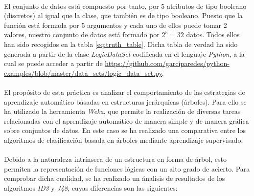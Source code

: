 \documentclass[10pt, a4paper,spanish]{article}
\begin{document}
		\paragraph{}
		El conjunto de datos está compuesto por tanto, por 5 atributos de tipo booleano (discretos) al igual que la clase, que también es de tipo booleano. Puesto que la función está formada por 5 argumentos y cada uno de ellos puede tomar 2 valores, nuestro conjunto de datos está formado por $2 ^ 5 = 32$ datos. Todos ellos han sido recogidos en la tabla \ref{eq:truth_table}. Dicha tabla de verdad ha sido generada a partir de la clase \emph{LogicDataSet} codificada en el lenguaje \emph{Python}, a la cual se puede acceder a partir de \url{https://github.com/garciparedes/python-examples/blob/master/data_sets/logic_data_set.py}\cite{github:garciparedes-python-examples}.


		\paragraph{}
		El propósito de esta práctica es analizar el comportamiento de las estrategias de aprendizaje automático básadas en estructuras jerárquicas (árboles). Para ello se ha utilizado la herramienta \emph{Weka}\cite{tool:weka}, que permite la realización de diversas tareas relacionadas con el aprendizaje automático de manera simple y de manera gráfica sobre conjuntos de datos. En este caso se ha realizado una comparativa entre los algoritmos de clasificación basada en árboles mediante aprendizaje supervisado.

		\paragraph{}
		Debido a la naturaleza intrínseca de un estructura en forma de árbol, esto permiten la representación de funciones lógicas con un alto grado de acierto. Para comprobar dicha cualidad, se ha realizado un ánalisis de resultados de los algoritmos \emph{ID3} y \emph{J48}, cuyas diferencias son las siguientes:
\end{document}
